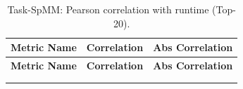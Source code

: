 \scriptsize
\begin{longtable}{>{\raggedright\arraybackslash}p{}
                  S[table-format=+1.6]
                  S[table-format=1.6]}
\caption{Task-SpMM: Pearson correlation with runtime (Top-20).}
\label{tab:app-spmm-top20}\\
\toprule
\textbf{Metric Name} & {\textbf{Correlation}} & {\textbf{Abs Correlation}} \\
\midrule
\endfirsthead
\toprule
\textbf{Metric Name} & {\textbf{Correlation}} & {\textbf{Abs Correlation}} \\
\midrule
\endhead
\midrule
{} \\
\endfoot
\bottomrule
\endlastfoot


\end{longtable}
